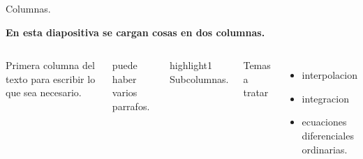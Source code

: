 \begin{frame}{Columnas.}

  \centering
  \textbf{  En esta diapositiva 
  se cargan cosas en   dos columnas. }
  \par
 
\begin{columns}
    Primera columna del texto para escribir
    lo que sea necesario.

    puede haber varios parrafos. 


  \begin{beamercolorbox}
    [ht=20pt,wd=\textwidth,center,
    colsep=5pt]
    {highlight1}
\centering Subcolumnas. \par 
  \end{beamercolorbox}
  \begin{columns}
      Temas a tratar

      \begin{itemize}
	  \item interpolacion
	  \item integracion
	  \item ecuaciones diferenciales
	    ordinarias. 
      \end{itemize}
  \end{columns}
\end{columns}
\end{frame}

